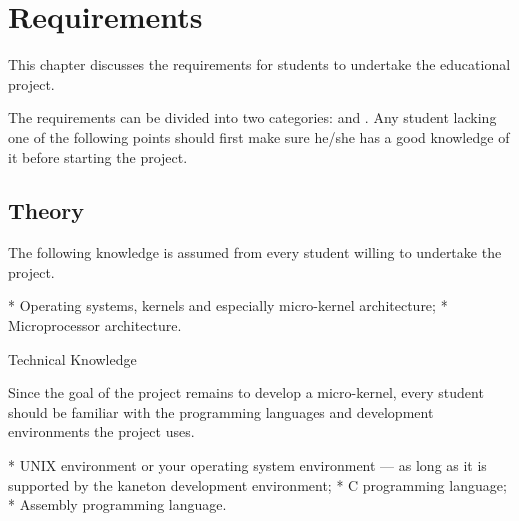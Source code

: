%
%
%
%
%
%

%
%

\chapter{Requirements}
\label{chapter:requirements}

This chapter discusses the requirements for students to undertake the
 educational project.

\newpage

%
%

The requirements can be divided into two categories:  and
. Any student lacking one of the following points should
first make sure he/she has a good knowledge of it before starting the
project.

%
%

\section{Theory}

The following knowledge is assumed from every student willing to
undertake the project.

   * Operating systems, kernels and especially micro-kernel architecture;
   * Microprocessor architecture.


Technical Knowledge

Since the goal of the project remains to develop a micro-kernel, every
student should be familiar with the programming languages and
development environments the project uses.

   * UNIX environment or your operating system environment --- as
long as it is supported by the kaneton development environment;
   * C programming language;
   * Assembly programming language.
